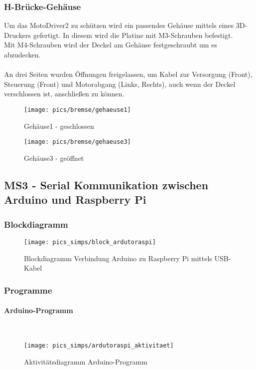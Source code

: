 \documentclass[12pt,a4paper]{article}
\begin{document}
\subsubsection*{H-Brücke-Gehäuse}
Um das MotoDriver2 zu schützen wird ein passendes Gehäuse mittels eines 3D-Druckers gefertigt. 
In diesem wird die Platine mit M3-Schrauben befestigt. \\
Mit M4-Schrauben wird der Deckel am Gehäuse festgeschraubt um es abzudecken. \\\\
%
An drei Seiten wurden Öffnungen freigelassen, um Kabel zur Versorgung (Front), Steuerung (Front) und 
Motorabgang (Links, Rechts), auch wenn der Deckel verschlossen ist, anschlie\ss en zu können. \\
%
\begin{figure}[h!]
	\centering
	\texttt{[image: pics/bremse/gehaeuse1]}
	\caption{Gehäuse1 - geschlossen}
\end{figure}
\begin{figure}[h!]
	\centering
	\texttt{[image: pics/bremse/gehaeuse3]}
	\caption{Gehäuse3 - geöffnet}
\end{figure}
%
%
\newpage
\subsection{MS3 - Serial Kommunikation zwischen Arduino und Raspberry Pi}
\subsubsection{Blockdiagramm}
\begin{figure}[h!]
	\centering
	\texttt{[image: pics\_simps/block\_ardutoraspi]}
	\caption{Blockdiagramm Verbindung Arduino zu Raspberry Pi mittels USB-Kabel}
\end{figure}
%
\subsubsection{Programme}
\paragraph{Arduino-Programm}\mbox{}\\
\begin{figure}[h!]
	\centering
	\texttt{[image: pics\_simps/ardutoraspi\_aktivitaet]}
	\caption{Aktivitätsdiagramm Arduino-Programm}
\end{figure}
%
%
\newpage
\end{document}

